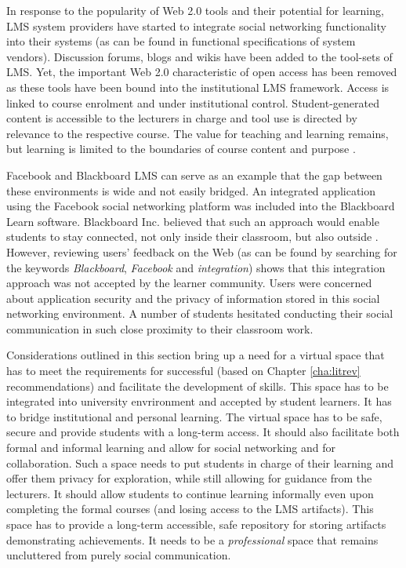 In response to the popularity of Web 2.0 tools and their potential for learning,
LMS system providers have started to integrate social networking functionality
into their systems (as can be found in functional specifications of system
vendors). Discussion forums, blogs and wikis have been added to the tool-sets of
LMS. Yet, the important Web 2.0 characteristic of open access has been removed
as these tools have been bound into the institutional LMS framework. Access is
linked to course enrolment and under institutional control. Student-generated
content is accessible to the lecturers in charge and tool use is directed by
relevance to the respective course. The value for teaching and learning remains,
but learning is limited to the boundaries of course content and purpose
\citep{Mott2010}.

Facebook and Blackboard LMS can serve as an example that the gap between
these environments is wide and not easily bridged. An integrated application
using the Facebook social networking platform was included into the Blackboard
Learn software. Blackboard Inc. believed that such an approach would enable
students to stay connected, not only inside their classroom, but also outside
\citep{BlackboardInc.2009}. However, reviewing users' feedback on the Web (as
can be found by searching for the keywords \textit{Blackboard},
\textit{Facebook} and \textit{integration}) shows that this integration approach
was not accepted by the learner community. Users were concerned about
application security and the privacy of information stored in this social
networking environment. A number of students hesitated conducting their social
communication in such close proximity to their classroom work. 

Considerations outlined in this section bring up a need for a virtual space that
has to meet the requirements for successful \LLLs (based on Chapter
\ref{cha:litrev} recommendations) and facilitate the development of \LLLs
skills. This space has to be integrated into university envrironment and
accepted by student learners. It has to bridge institutional and personal
learning. The virtual space has to be safe, secure and provide students with a
long-term access. It should also facilitate both formal and informal learning
and allow for social networking and for collaboration. Such a space needs to put
students in charge of their learning and offer them privacy for exploration,
while still allowing for guidance from the lecturers. It should allow students
to continue learning informally even upon completing the formal courses (and
losing access to the LMS artifacts). This space has to provide a long-term
accessible, safe repository for storing artifacts demonstrating achievements. It
needs to be a \textit{professional} space that remains uncluttered from purely
social communication.

